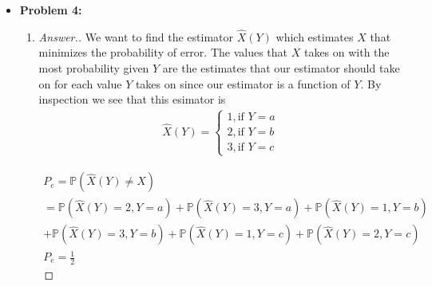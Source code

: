 \documentclass[10pt,twoside]{article}
\newcommand{\Pro}{\ensuremath{\mathbb{P}}}
\begin{document}
\begin{itemize}
\begin{proof}[Answer.]
    Let $f$ be a function $f:\R\to\R$ defined as $f(t) = t\log t$. Let $t_i,t_j\in \R$. Then, by the log-sum inequality,
    \begin{gather*}
        t_i\log t_i + t_j\log t_j \geq (t_i + t_j)\log (t_i + t_j)
    \end{gather*}
    Additionally, since $\log$ is a strictly increasing function, $\log(\frac{p_i + p_j}{2}) < \log (p_i + p_j)$. Since we by convention let $\log(0) = 0$, $\log$ is then a monotonically increasing function and $\log(\frac{p_i + p_j}{2}) \leq \log (p_i + p_j)$. Therefore, 
    \begin{gather*}
        -(p_i + p_j)\log (\frac{p_i + p_j}{2}) + p_i\log p_i + p_j\log p_j \\
        \geq  -(p_i + p_j)\log (p_i + p_j) + p_i\log p_i + p_j\log p_j \geq 0
    \end{gather*}
    Thus, $H(Q) - H(P) \geq 0$ which shows that $H(Q) \geq H(P)$, as required.
    
    \end{proof}

\newpage
    
    \item\textbf{Problem 4:} \newline
    \noindent\makebox[\linewidth]{\rule{18cm}{0.4pt}}
    \begin{enumerate} 
    \item\begin{proof}[Answer.]
    We want to find the estimator $\hat{X}(Y)$ which estimates $X$ that minimizes the probability of error. The values that $X$ takes on with the most probability given $Y$ are the estimates that our estimator should take on for each value $Y$ takes on since our estimator is a function of $Y$. By inspection we see that this esimator is
    \begin{gather*}
        \hat{X}(Y) = \begin{cases}
        1, \text{if $Y=a$} \\
        2, \text{if $Y = b$} \\
        3, \text{if $Y = c$}
        \end{cases}
    \end{gather*}

    \begin{gather*}
        P_e = \Pro(\hat{X}(Y)\neq X) \\
        = \Pro(\hat{X}(Y) = 2, Y=a) + \Pro(\hat{X}(Y) = 3, Y=a) + \Pro(\hat{X}(Y)= 1, Y=b)\\
        + \Pro(\hat{X}(Y) = 3, Y=b) + \Pro(\hat{X}(Y) = 1, Y=c) + \Pro(\hat{X}(Y) = 2, Y=c) \\
        P_e = \frac{1}{2}
    \end{gather*}
    

\end{proof}
\end{enumerate}
\end{itemize}
\end{document}
